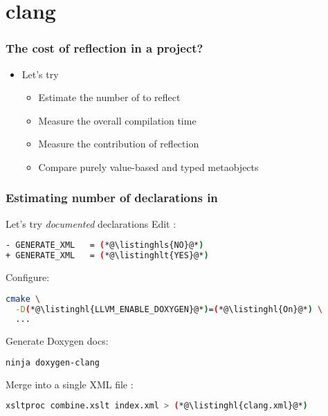 \documentclass[compress,table,xcolor=table]{beamer}
\begin{document}
\section{clang}
\begin{frame}
  \frametitle{The cost of reflection in a  project?}
  \LARGE
  \begin{itemize}
    \item Let's try 
    \begin{itemize}
      \Large
      \item Estimate the number of  to reflect
      \item Measure the overall compilation time
      \item Measure the contribution of reflection
      \item Compare purely value-based and typed metaobjects
    \end{itemize}
  \end{itemize}
\end{frame}
\begin{frame}[fragile]
  \frametitle{Estimating number of declarations in }
  Let's try {\em \larger documented} declarations
  \vfill
  Edit :
  \begin{lstlisting}[language=bash,basicstyle=\scriptsize\ttfamily]
- GENERATE_XML   = (*@\listinghls{NO}@*)
+ GENERATE_XML   = (*@\listinghlt{YES}@*)
  \end{lstlisting}
  Configure:
  \begin{lstlisting}[language=bash,basicstyle=\scriptsize\ttfamily]
cmake \
  -D(*@\listinghl{LLVM_ENABLE_DOXYGEN}@*)=(*@\listinghl{On}@*) \
  ...
  \end{lstlisting}
  Generate Doxygen docs:
  \begin{lstlisting}[language=bash,basicstyle=\scriptsize\ttfamily]
ninja doxygen-clang
  \end{lstlisting}
  Merge into a single XML file : 
  \begin{lstlisting}[language=bash,basicstyle=\scriptsize\ttfamily]
xsltproc combine.xslt index.xml > (*@\listinghl{clang.xml}@*)
  \end{lstlisting}
\end{frame}
\end{document}

